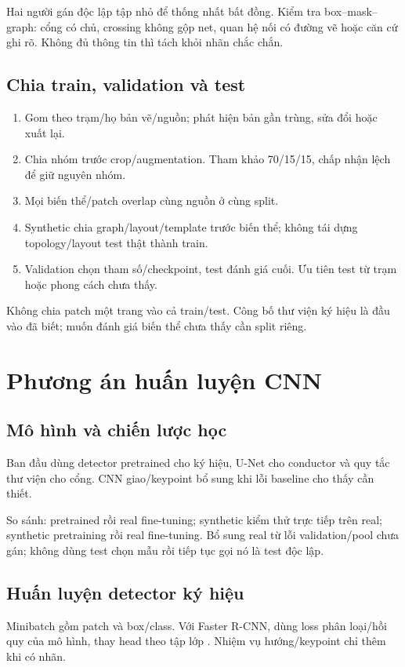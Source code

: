\documentclass[11pt,a4paper]{article}
\begin{document}
Hai người gán độc lập tập nhỏ để thống nhất bất đồng. Kiểm tra box--mask--graph: cổng có chủ, crossing không gộp net, quan hệ nối có đường vẽ hoặc căn cứ ghi rõ. Không đủ thông tin thì tách khỏi nhãn chắc chắn.

\subsection{Chia train, validation và test}
\begin{enumerate}
  \item Gom theo trạm/họ bản vẽ/nguồn; phát hiện bản gần trùng, sửa đổi hoặc xuất lại.
  \item Chia nhóm trước crop/augmentation. Tham khảo 70/15/15, chấp nhận lệch để giữ nguyên nhóm.
  \item Mọi biến thể/patch overlap cùng nguồn ở cùng split.
  \item Synthetic chia graph/layout/template trước biến thể; không tái dựng topology/layout test thật thành train.
  \item Validation chọn tham số/checkpoint, test đánh giá cuối. Ưu tiên test từ trạm hoặc phong cách chưa thấy.
\end{enumerate}
Không chia patch một trang vào cả train/test. Công bố thư viện ký hiệu là đầu vào đã biết; muốn đánh giá biến thể chưa thấy cần split riêng.

\section{Phương án huấn luyện CNN}
\subsection{Mô hình và chiến lược học}
Ban đầu dùng detector pretrained cho ký hiệu, U-Net cho conductor và quy tắc thư viện cho cổng. CNN giao/keypoint bổ sung khi lỗi baseline cho thấy cần thiết.

So sánh: pretrained rồi real fine-tuning; synthetic kiểm thử trực tiếp trên real; synthetic pretraining rồi real fine-tuning. Bổ sung real từ lỗi validation/pool chưa gán; không dùng test chọn mẫu rồi tiếp tục gọi nó là test độc lập.

\subsection{Huấn luyện detector ký hiệu}
Minibatch gồm patch và box/class. Với Faster R-CNN, dùng loss phân loại/hồi quy của mô hình, thay head theo tập lớp \cite{fasterrcnn}. Nhiệm vụ hướng/keypoint chỉ thêm khi có nhãn.
\end{document}
